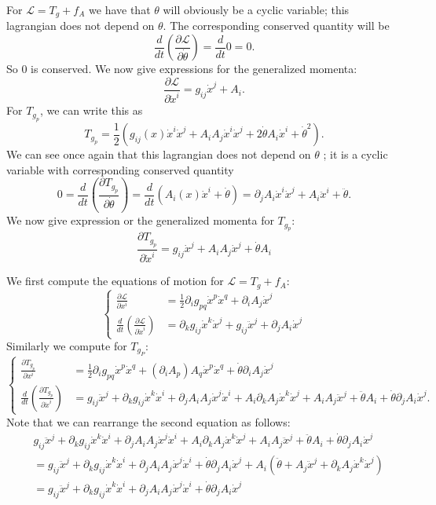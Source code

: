 \documentclass[12pt, a4paper]{article}
\theoremstyle{definition}
\newcommand{\eL}{\mathcal{L}}                         %
\begin{document}
\item For $\eL = T_g + f_A$ we have that $\theta$ will obviously be a cyclic variable; this lagrangian does not depend on $\theta$. The corresponding conserved quantity will be
	$$ \frac{d}{dt} \left( \frac{\partial \eL}{\partial \dot{\theta}} \right) = \frac{d}{dt}0 = 0.$$
So $0$ is conserved. 
We now give expressions for the generalized momenta:
$$ \frac{\partial \eL}{\partial \dot{x}^i}  = g_{ij}\dot{x}^j+ A_i. $$
For $T_{g_p}$, we can write this as 
	$$ T_{g_p} =  \frac{1}{2} \left(g_{ij}(x)\dot{x}^i \dot{x}^j + A_iA_j\dot{x}^i \dot{x}^j + 2\dot{\theta} A_i \dot{x}^i + \dot{\theta}^2 \right).$$
We can see once again that this lagrangian does not depend on $\theta$ ; it is a cyclic variable with corresponding conserved quantity
$$ 0 =  \frac{d}{dt} \left( \frac{\partial T_{g_p}}{\partial \dot{\theta}} \right) =  \frac{d}{dt} \left(A_i(x) \dot{x}^i + \dot{\theta}\right) = \partial_j A_i \dot{x}^i \dot{x}^j  + A_i \ddot{x}^i  + \ddot{\theta} . $$
We now give expression or the generalized momenta for $T_{g_p}$: 
$$ \frac{\partial T_{g_p}}{\partial \dot{x}^i} = g_{ij}\dot{x}^j + A_i A_j\dot{x}^j  + \dot{\theta} A_i  $$
\item We first compute the equations of motion for $\eL = T_g + f_A$:
	$$ \begin{cases}
		\frac{\partial \eL}{\partial x^i} &= \frac{1}{2}\partial_i g_{pq} \dot{x}^p \dot{x}^q + \partial_i A_j \dot{x}^j
		\\ \frac{d}{dt} \left( \frac{\partial \eL}{\partial \dot{x}^i} \right) &=  \partial_k g_{ij} \dot{x}^k\dot{x}^j + g_{ij} \ddot{x}^j + \partial_j A_i \dot{x}^j
	\end{cases}$$	
	Similarly we compute for $T_{g_P}$:
	$$ \begin{cases}
		\frac{\partial T_{g_p}}{\partial x^i} & = \frac{1}{2}\partial_i g_{pq} \dot{x}^p \dot{x}^q + (\partial_i A_p)A_q \dot{x}^p \dot{x}^q + \dot{\theta} \partial_i A_j \dot{x}^j
		\\ \frac{d}{dt} \left( \frac{\partial T_{g_p}}{\partial \dot{x}^i} \right) & = g_{ij} \ddot{x}^j + \partial_k g_{ij} \dot{x}^k \dot{x}^i + \partial_j A_i A_j \dot{x}^j \dot{x}^i + A_i \partial_k A_j \dot{x}^k \dot{x}^j + A_i A_j \ddot{x}^j + \ddot{\theta} A_i +  \dot{\theta} \partial_j A_i \dot{x}^j.
	\end{cases}$$
Note that we can rearrange the second equation as follows: 
\begin{align*}
	& g_{ij} \ddot{x}^j + \partial_k g_{ij} \dot{x}^k \dot{x}^i + \partial_j A_i A_j \dot{x}^j \dot{x}^i + A_i \partial_k A_j \dot{x}^k \dot{x}^j + A_i A_j \ddot{x}^j + \ddot{\theta} A_i +  \dot{\theta} \partial_j A_i \dot{x}^j
	\\ & =  g_{ij} \ddot{x}^j + \partial_k g_{ij} \dot{x}^k \dot{x}^i + \partial_j A_i A_j \dot{x}^j \dot{x}^i  +   \dot{\theta} \partial_j A_i \dot{x}^j + A_i \left(\ddot{\theta} + A_j \ddot{x}^j + \partial_k A_j \dot{x}^k \dot{x}^j  \right)
	\\ & =  g_{ij} \ddot{x}^j + \partial_k g_{ij} \dot{x}^k \dot{x}^i + \partial_j A_i A_j \dot{x}^j \dot{x}^i  +   \dot{\theta} \partial_j A_i \dot{x}^j \tag{Since conserved.}
\end{align*}
\end{document}
